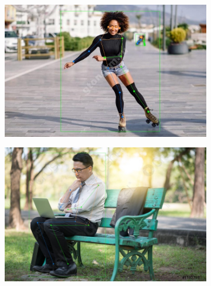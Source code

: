 \begin{figure}[h]
\begin{subfigure}[b]{.5\textwidth}
	\centering
	\includegraphics[width=\textwidth]{./images/MMPose/19}
	\caption{ }
\end{subfigure}
\begin{subfigure}[b]{.5\textwidth}
	\centering
   \includegraphics[width=\textwidth]{./images/MMPose/23}
   \caption{ }
\end{subfigure}
\begin{subfigure}[b]{.5\textwidth}
	\centering

\end{subfigure}
\end{figure}
